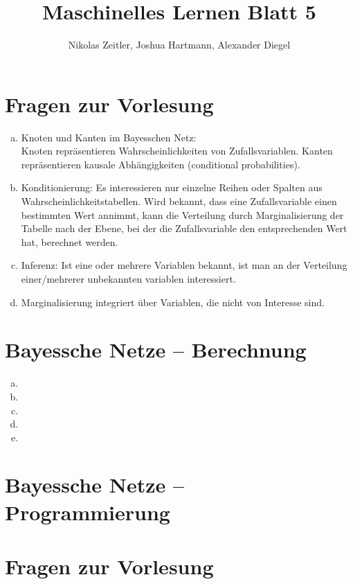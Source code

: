 \documentclass[a4paper]{scrartcl}
\author{Nikolas Zeitler, Joshua Hartmann, Alexander Diegel}
\title{Maschinelles Lernen Blatt 5}
\begin{document}
\maketitle
\section{Fragen zur Vorlesung}

\begin{enumerate}[a)]
	\item Knoten und Kanten im Bayesschen Netz:\\
	Knoten repräsentieren Wahrscheinlichkeiten von Zufallsvariablen.
	Kanten repräsentieren kausale Abhängigkeiten (conditional probabilities).
	
	\item Konditionierung: Es interessieren nur einzelne Reihen oder Spalten aus Wahrscheinlichkeitstabellen. Wird bekannt, dass eine Zufallsvariable einen bestimmten Wert annimmt, kann die Verteilung durch Marginalisierung der Tabelle nach der Ebene, bei der die Zufallsvariable den entsprechenden Wert hat, berechnet werden.
	
	\item Inferenz: Ist eine oder mehrere Variablen bekannt, ist man an der Verteilung einer/mehrerer unbekannten variablen interessiert.
	
	\item Marginalisierung integriert über Variablen, die nicht von Interesse sind. 
\end{enumerate}


\section{Bayessche Netze – Berechnung}

\begin{enumerate}[(a)]
	\item 
	\item 
	\item 
	\item 
	\item 
\end{enumerate}


\section{Bayessche Netze – Programmierung}



\section{Fragen zur Vorlesung}
\end{document}
